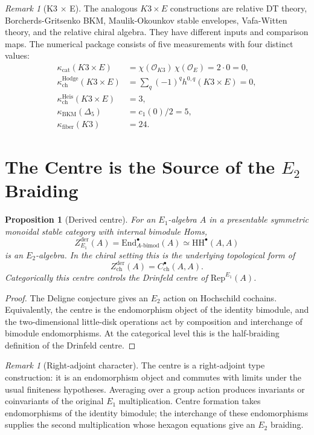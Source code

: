 \documentclass[11pt]{amsart}
\newtheorem{proposition}[theorem]{Proposition}
\theoremstyle{definition}
\theoremstyle{remark}
\newtheorem{remark}[theorem]{Remark}
\newcommand{\Rep}{\mathrm{Rep}}
\newcommand{\HH}{\mathrm{HH}}
\begin{document}
\begin{remark}[K3 \texorpdfstring{$\times$}{x} E]
The analogous $K3\times E$ constructions are relative DT theory,
Borcherds-Gritsenko BKM, Maulik-Okounkov stable envelopes,
Vafa-Witten theory, and the relative chiral algebra.  They have
different inputs and comparison maps.  The numerical package consists
of five measurements with four distinct values:
\[
\begin{aligned}
 \kappa_{\mathrm{cat}}(K3\times E)
   &=\chi(\mathcal O_{K3})\,\chi(\mathcal O_E)=2\cdot0=0,\\
 \kappa_{\mathrm{ch}}^{\mathrm{Hodge}}(K3\times E)
   &=\sum_q(-1)^q h^{0,q}(K3\times E)=0,\\
 \kappa_{\mathrm{ch}}^{\mathrm{Heis}}(K3\times E)&=3,\\
 \kappa_{\mathrm{BKM}}(\Delta_5)&=c_1(0)/2=5,\\
 \kappa_{\mathrm{fiber}}(K3)&=24.
\end{aligned}
\]
\end{remark}

\section{The Centre is the Source of the \texorpdfstring{$E_2$}{E2} Braiding}
\label{sec:centre}

\begin{proposition}[Derived centre]
\label{prop:centre}
For an $E_1$-algebra $A$ in a presentable symmetric monoidal stable
category with internal bimodule Homs,
\[
  Z^{\mathrm{der}}_{E_1}(A)
  =
  \mathrm{End}^\bullet_{A\text{-bimod}}(A)
  \simeq
  \HH^\bullet(A,A)
\]
is an $E_2$-algebra.  In the chiral setting this is the underlying
topological form of
\[
  Z^{\mathrm{der}}_{\mathrm{ch}}(A)
  =
  C^\bullet_{\mathrm{ch}}(A,A).
\]
Categorically this centre controls the Drinfeld centre of
$\Rep^{E_1}(A)$.
\end{proposition}

\begin{proof}
The Deligne conjecture gives an $E_2$ action on Hochschild cochains.
Equivalently, the centre is the endomorphism object of the identity
bimodule, and the two-dimensional little-disk operations act by
composition and interchange of bimodule endomorphisms.  At the
categorical level this is the half-braiding definition of the
Drinfeld centre.
\end{proof}

\begin{remark}[Right-adjoint character]
The centre is a right-adjoint type construction: it is an endomorphism
object and commutes with limits under the usual finiteness hypotheses.
Averaging over a group action produces invariants or coinvariants of the
original $E_1$ multiplication.  Centre formation takes endomorphisms of
the identity bimodule; the interchange of these endomorphisms supplies
the second multiplication whose hexagon equations give an $E_2$
braiding.
\end{remark}
\end{document}
